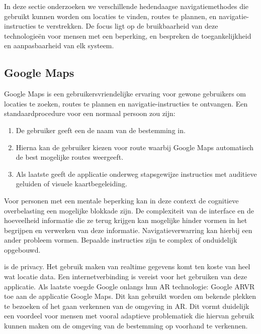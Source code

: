 In deze sectie onderzoeken we verschillende hedendaagse navigatiemethodes die gebruikt kunnen worden om locaties te vinden, routes te plannen, en navigatie-instructies te verstrekken. De focus ligt op de bruikbaarheid van deze technologieën voor mensen met een beperking, en bespreken de toegankelijkheid en aanpasbaarheid van elk systeem.

\subsection{Google Maps}
\label{sec:google-maps}


Google Maps is een gebruikersvriendelijke ervaring voor gewone gebruikers om locaties te zoeken, routes te plannen en navigatie-instructies te ontvangen. Een standaardprocedure voor een normaal persoon zou zijn:

\begin{enumerate}
    \item De gebruiker geeft een de naam van de bestemming in.
    \item Hierna kan de gebruiker kiezen voor route waarbij Google Maps automatisch de best mogelijke routes weergeeft.
    \item Als laatste geeft de applicatie onderweg stapsgewijze instructies met auditieve geluiden of visuele kaartbegeleiding.
\end{enumerate}

Voor personen met een mentale beperking kan in deze context de cognitieve overbelasting een mogelijke blokkade zijn. De complexiteit van de interface en de hoeveelheid informatie die ze terug krijgen kan mogelijke hinder vormen in het begrijpen en verwerken van deze informatie. Navigatieverwarring kan hierbij een ander probleem vormen. Bepaalde instructies zijn te complex of onduidelijk opgebouwd.

is de privacy. Het gebruik maken van realtime gegevens komt ten koste van heel wat locatie data. Een internetverbinding is vereist voor het gebruiken van deze applicatie. Als laatste voegde Google onlangs hun AR technologie: Google ARVR toe aan de applicatie Google Maps. Dit kan gebruikt worden om bekende plekken te bezoeken of het gaan verkennen van de omgeving in AR. Dit vormt duidelijk een voordeel voor mensen met vooral adaptieve problematiek die hiervan gebruik kunnen maken om de omgeving van de bestemming op voorhand te verkennen.

